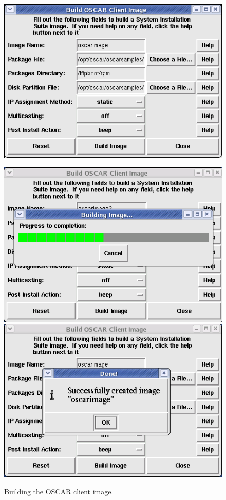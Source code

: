 \begin{figure}[!ht]
  \begin{center}
    \centerline{\includegraphics[scale=\imgscale]{figs/4a_sbs-build-image1}}
    \vspace{\imgvskip}
    \centerline{
      \includegraphics[scale=\imgscale]{figs/4a_sbs-build-image2}
      \hspace{\imghskip}
      \includegraphics[scale=\imgscale]{figs/4c_sbs-build-image3}
      }
    \caption{Building the OSCAR client image.}
    \label{fig:sbs-build-image}
  \end{center}
\end{figure}


